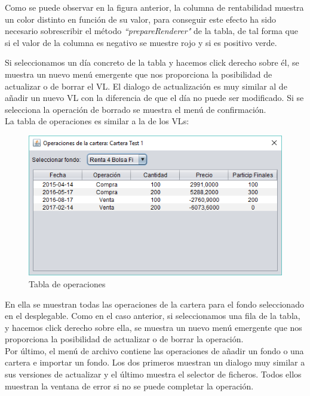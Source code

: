 \documentclass[12pt, a4paper]{book}
\begin{document}
Como se puede observar en la figura anterior, la columna de rentabilidad muestra un color distinto en función de su valor, para conseguir este efecto ha sido necesario sobrescribir el método \textit{``prepareRenderer"} de la tabla, de tal forma que si el valor de la columna es negativo se muestre rojo y si es positivo verde.\\
\newpage

Si seleccionamos un día concreto de la tabla y hacemos click derecho sobre él, se muestra un nuevo menú emergente que nos proporciona la posibilidad de actualizar o de borrar el \gls{VL}. El dialogo de actualización es muy similar al de añadir un nuevo \gls{VL} con la diferencia de que el día no puede ser modificado. Si se selecciona la operación de borrado se muestra el menú de confirmación. 
\\

La tabla de operaciones es similar a la de los \gls{VL}s:

	\begin{figure}[htbp]
	\centering
	\includegraphics[width=12cm]{figuras/ops.PNG}
	\caption{Tabla de operaciones}
	\label{fig:ops}
	\end {figure}

En ella se muestran todas las operaciones de la cartera para el fondo seleccionado en el desplegable. Como en el caso anterior, si seleccionamos una fila de la tabla, y hacemos click derecho sobre ella, se muestra un nuevo menú emergente que nos proporciona la posibilidad de actualizar o de borrar la operación.
\\

Por último, el menú de archivo contiene las operaciones de añadir un fondo o una cartera e importar un fondo. Los dos primeros muestran un dialogo muy similar a sus versiones de actualizar y el último muestra el selector de ficheros. Todos ellos muestran la ventana de error si no se puede completar la operación.
\newpage
\end{document}
